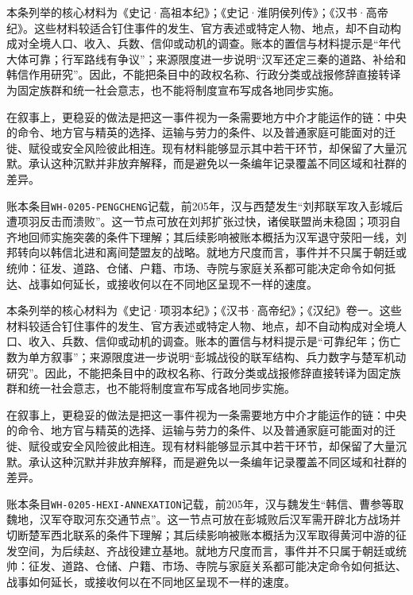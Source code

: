 本条列举的核心材料为《史记·高祖本纪》；《史记·淮阴侯列传》；《汉书·高帝纪》。这些材料较适合钉住事件的发生、官方表述或特定人物、地点，却不自动构成对全境人口、收入、兵数、信仰或动机的调查。账本的置信与材料提示是“年代大体可靠；行军路线有争议”；来源限度进一步说明“汉军还定三秦的道路、补给和韩信作用研究”。因此，不能把条目中的政权名称、行政分类或战报修辞直接转译为固定族群和统一社会意志，也不能将制度宣布写成各地同步实施。

在叙事上，更稳妥的做法是把这一事件视为一条需要地方中介才能运作的链：中央的命令、地方官与精英的选择、运输与劳力的条件、以及普通家庭可能面对的迁徙、赋役或安全风险彼此相连。现有材料能够显示其中若干环节，却保留了大量沉默。承认这种沉默并非放弃解释，而是避免以一条编年记录覆盖不同区域和社群的差异。

账本条目\texttt{WH-0205-PENGCHENG}记载，前205年，汉与西楚发生“刘邦联军攻入彭城后遭项羽反击而溃败”。这一节点可放在刘邦扩张过快，诸侯联盟尚未稳固；项羽自齐地回师实施突袭的条件下理解；其后续影响被账本概括为汉军退守荥阳一线，刘邦转向以韩信北进和离间楚盟友的战略。就地方尺度而言，事件并不只属于朝廷或统帅：征发、道路、仓储、户籍、市场、寺院与家庭关系都可能决定命令如何抵达、战事如何延长，或接收何以在不同地区呈现不一样的速度。

本条列举的核心材料为《史记·项羽本纪》；《汉书·高帝纪》；《汉纪》卷一。这些材料较适合钉住事件的发生、官方表述或特定人物、地点，却不自动构成对全境人口、收入、兵数、信仰或动机的调查。账本的置信与材料提示是“可靠纪年；伤亡数为单方叙事”；来源限度进一步说明“彭城战役的联军结构、兵力数字与楚军机动研究”。因此，不能把条目中的政权名称、行政分类或战报修辞直接转译为固定族群和统一社会意志，也不能将制度宣布写成各地同步实施。

在叙事上，更稳妥的做法是把这一事件视为一条需要地方中介才能运作的链：中央的命令、地方官与精英的选择、运输与劳力的条件、以及普通家庭可能面对的迁徙、赋役或安全风险彼此相连。现有材料能够显示其中若干环节，却保留了大量沉默。承认这种沉默并非放弃解释，而是避免以一条编年记录覆盖不同区域和社群的差异。

账本条目\texttt{WH-0205-HEXI-ANNEXATION}记载，前205年，汉与魏发生“韩信、曹参等取魏地，汉军夺取河东交通节点”。这一节点可放在彭城败后汉军需开辟北方战场并切断楚军西北联系的条件下理解；其后续影响被账本概括为汉军取得黄河中游的征发空间，为后续赵、齐战役建立基地。就地方尺度而言，事件并不只属于朝廷或统帅：征发、道路、仓储、户籍、市场、寺院与家庭关系都可能决定命令如何抵达、战事如何延长，或接收何以在不同地区呈现不一样的速度。

